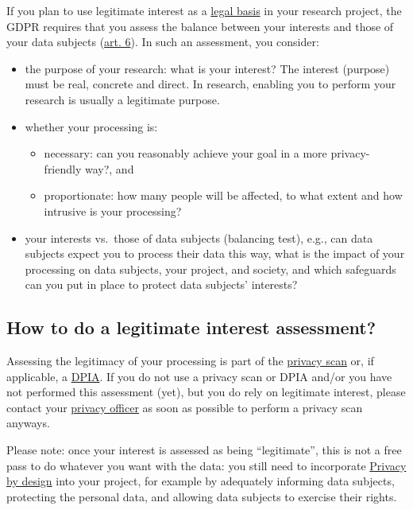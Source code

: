 \documentclass[
]{book}
\providecommand{\tightlist}{%
  \setlength{\itemsep}{0pt}\setlength{\parskip}{0pt}}
\begin{document}
If you plan to use legitimate interest as a \protect\hyperlink{legal-basis}{legal basis} in your
research project, the GDPR requires that you assess the balance between your
interests and those of your data subjects
(\href{https://gdpr-info.eu/art-6-gdpr/}{art. 6}). In such an
assessment, you consider:

\begin{itemize}
\tightlist
\item
  the purpose of your research: what is your interest? The interest (purpose)
  must be real, concrete and direct. In research, enabling you to perform your
  research is usually a legitimate purpose.
\item
  whether your processing is:

  \begin{itemize}
  \tightlist
  \item
    necessary: can you reasonably achieve your goal in a more privacy-friendly
    way?, and
  \item
    proportionate: how many people will be affected, to what extent and how
    intrusive is your processing?
  \end{itemize}
\item
  your interests vs.~those of data subjects (balancing test), e.g., can data
  subjects expect you to process their data this way, what is the impact of your
  processing on data subjects, your project, and society, and which safeguards can
  you put in place to protect data subjects' interests?
\end{itemize}

\hypertarget{lia-how}{%
\subsection{How to do a legitimate interest assessment?}\label{lia-how}}

Assessing the legitimacy of your processing is part of the
\protect\hyperlink{privacy-scan}{privacy scan} or, if applicable, a \protect\hyperlink{dpia}{DPIA}. If you do not
use a privacy scan or DPIA and/or you have not performed this assessment (yet),
but you do rely on legitimate interest, please contact your
\protect\hyperlink{support}{privacy officer} as soon as possible to perform a privacy scan anyways.

Please note: once your interest is assessed as being ``legitimate'', this is not
a free pass to do whatever you want with the data: you still need to incorporate
\protect\hyperlink{privacy-by-design}{Privacy by design} into your project, for example by
adequately informing data subjects, protecting the personal data, and allowing
data subjects to exercise their rights.
\end{document}
